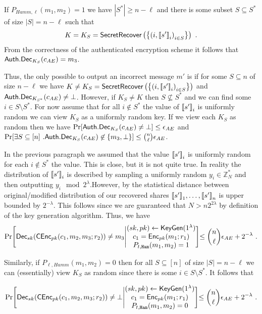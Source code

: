 \begin{proofof}{}
If $P_{Hamm,\ell}(m_1,m_2)=1$ we have $|S^*| \geq n-\ell$ and there is some subset $S \subseteq S^*$ of size $|S|=n-\ell$ such that \[ K=K_{S} = \recover\left( \left\{\left(i, \ldb s' \rdb_i\right)_{i \in S} \right\} \right)   \ . \]
From the correctness of the authenticated encryption scheme it follows that ${\mathsf{Auth}}.{\mathsf{Dec}}_{K_{S}}(c_{AE}) = m_3$.  

Thus, the only possible to output an incorrect message $m'$ is if for some $S \subseteq n$ of size $n-\ell$ we have $K \neq K_S = {\mathsf{SecretRecover}}\left( \left\{\left(i, \mathopen{\lbrack\!\lbrack} s' \mathclose{\rbrack\!\rbrack}_i\right)_{i \in S}\right\}\right)$ and ${\mathsf{Auth}}.{\mathsf{Dec}}_{K_{S^*}}(c_{AE}) \neq \bot$. However, if $K_S \neq K$ then $S \not \subseteq S^*$ and we can find some $i \in S \setminus S^* $. For now assume that for all $i \not\in S^*$ the value of $\mathopen{\lbrack\!\lbrack} s' \mathclose{\rbrack\!\rbrack}_i$ is uniformly random we can view $K_S$ as a uniformly random key. If we view each $K_S$ as random then we have $\Pr[{\mathsf{Auth}}.{\mathsf{Dec}}_{K_S}(c_{AE}) \neq \bot] \leq \epsilon_{AE}$ and $\Pr[\exists S \subseteq [n]~.  {\mathsf{Auth}}.{\mathsf{Dec}}_{K_S}(c_{AE}) \not\in \{m_3, \bot \} ] \leq {n \choose \ell} \epsilon_{AE}$. 

In the previous paragraph we assumed that the value $\mathopen{\lbrack\!\lbrack} s' \mathclose{\rbrack\!\rbrack}_i$ is uniformly random for each  $i \not\in S^*$ the value. This is close, but it is not quite true. In reality the distribution of $\mathopen{\lbrack\!\lbrack} s' \mathclose{\rbrack\!\rbrack}_i$ is described by sampling a uniformly random $y_i \in \mathbb{Z}_N^*$ and then outputting $y_i \mod{2^{\lambda}}$.However, by  the statistical distance between original/modified distribution of our recovered shares $ \mathopen{\lbrack\!\lbrack} s' \mathclose{\rbrack\!\rbrack}_1,\ldots,   \mathopen{\lbrack\!\lbrack} s' \mathclose{\rbrack\!\rbrack}_n$ is upper bounded by $2^{-\lambda}$. This follows since we are guaranteed that $N > n 2^{2\lambda}$ by definition of the key generation algorithm. Thus, we have 
\[ \Pr \Biggl[{\mathsf{Dec}}_{sk}({\mathsf{C}}{\mathsf{Enc}}_{pk}(c_1, m_2, m_3; r_2)) \neq m_3 \Biggl| \begin{matrix}
	(sk, pk)\gets {\ensuremath{\mathsf{KeyGen}}} (1^\lambda) \\ 
	c_1 = {\mathsf{Enc}}_{pk}(m_1; r_1) \\
	P_{t,{\mathtt{Ham}}}  (m_1, m_2) = 1
	\end{matrix} \Biggl] \leq  {n \choose \ell} \epsilon_{AE} + 2^{-\lambda} \ . \]

Similarly, if $P_{\ell,Hamm}(m_1,m_2)=0$ then for all $S \subseteq [n]$ of size $|S|=n-\ell$ we can (essentially) view $K_S$ as random since there is some $i \in S \setminus S^*$. It follows that 

\[ \Pr \Biggl[{\mathsf{Dec}}_{sk}({\mathsf{C}}{\mathsf{Enc}}_{pk}(c_1, m_2, m_3; r_2)) \neq \bot \Biggl| \begin{matrix}
	(sk, pk)\gets {\ensuremath{\mathsf{KeyGen}}} (1^\lambda) \\ 
	c_1 = {\mathsf{Enc}}_{pk}(m_1; r_1) \\
	P_{t,{\mathtt{Ham}}}  (m_1, m_2) = 0
	\end{matrix} \Biggl] \leq {n \choose \ell} \epsilon_{AE} + 2^{-\lambda} \ . \]




	
	
\end{proofof}


